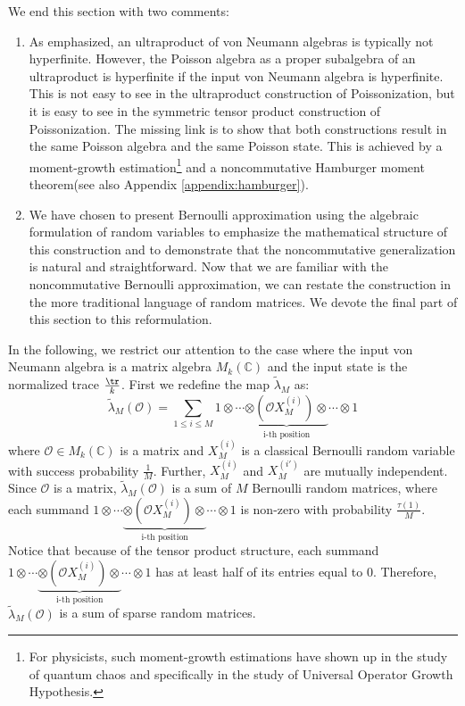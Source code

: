 \documentclass[a4paper,11pt]{article}
\theoremstyle{definition}
\numberwithin{equation}{section}
\begin{document}
We end this section with two comments:
\begin{enumerate}
    \item As emphasized, an ultraproduct of von Neumann algebras is typically not hyperfinite. However, the Poisson algebra as a proper subalgebra of an ultraproduct is hyperfinite if the input von Neumann algebra is hyperfinite. This is not easy to see in the ultraproduct construction of Poissonization, but it is easy to see in the symmetric tensor product construction of Poissonization. The missing link is to show that both constructions result in the same Poisson algebra and the same Poisson state. This is achieved by a moment-growth estimation\footnote{For physicists, such moment-growth estimations have shown up in the study of quantum chaos and specifically in the study of Universal Operator Growth Hypothesis\cite{PCASA}.} and a noncommutative Hamburger moment theorem\cite{MAW}(see also Appendix \ref{appendix:hamburger}).
    \item We have chosen to present Bernoulli approximation using the algebraic formulation of random variables to emphasize the mathematical structure of this construction and to demonstrate that the noncommutative generalization is natural and straightforward. Now that we are familiar with the noncommutative Bernoulli approximation, we can restate the construction in the more traditional language of random matrices. We devote the final part of this section to this reformulation.
\end{enumerate}
In the following, we restrict our attention to the case where the input von Neumann algebra is a matrix algebra $M_k(\mathbb{C})$ and the input state is the normalized trace $\frac{\tr}{k}$. First we redefine the map $\widetilde{\lambda}_M$ as:
\begin{equation}
    \widetilde{\lambda}_M(\mathcal{O}) = \sum_{1\leq i\leq M}1\otimes\cdots\underbrace{\otimes(\mathcal{O}X^{(i)}_M)\otimes}_\text{i-th position}\cdots\otimes 1
\end{equation}
where $\mathcal{O}\in M_k(\mathbb{C})$ is a matrix and $X_M^{(i)}$ is a classical Bernoulli random variable with success probability $\frac{1}{M}$. Further, $X_M^{(i)}$ and $X_M^{(i')}$ are mutually independent. Since $\mathcal{O}$ is a matrix, $\widetilde{\lambda}_M(\mathcal{O})$ is a sum of $M$ Bernoulli random matrices, where each summand $1\otimes\cdots\underbrace{\otimes(\mathcal{O}X^{(i)}_M)\otimes}_\text{i-th position}\cdots\otimes 1$ is non-zero with probability $\frac{\tau(1)}{M}$. Notice that because of the tensor product structure, each summand $1\otimes\cdots\underbrace{\otimes(\mathcal{O}X^{(i)}_M)\otimes}_\text{i-th position}\cdots\otimes 1$ has at least half of its entries equal to $0$. Therefore, $\widetilde{\lambda}_M(\mathcal{O})$ is a sum of sparse random matrices. 
\end{document}

